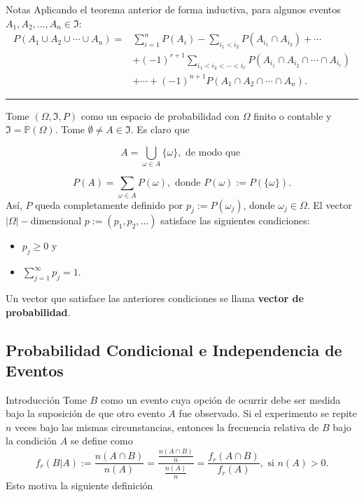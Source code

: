 \documentclass{beamer}
\begin{document}
	\begin{frame}[allowframebreaks]{Notas}
	Aplicando el teorema anterior de forma inductiva, para algunos eventos $A_1,A_2,\dots,A_n\in\Im$:
	\begin{align*}
	P(A_1\cup A_2\cup \cdots\cup A_n)=&\sum_{i=1}^n P(A_i)-\sum_{i_1<i_2}P(A_{i_{1}}\cap A_{i_{2}})+\cdots \\    
			& +(-1)^{r+1}\sum_{i_1<i_2<	\cdots<i_r}P(A_{i_1}\cap A_{i_2}\cap\cdots\cap A_{i_r})\\
			&+\cdots+(-1)^{n+1}P(A_1\cap A_2\cap \cdots\cap A_n).
	\end{align*}
	\noindent\rule{8cm}{0.4pt}
	
	Tome $(\Omega,\Im,P)$ como un espacio de probabilidad con $\Omega$ finito o contable y $\Im =\mathbb{P}(\Omega)$. Tome $\emptyset\neq A \in\Im.$ Es claro que
	
	$$A=\bigcup_{\omega\in A} \{\omega\}, \text{ de modo que }$$
	
	$$P(A)=\sum_{\omega\in A} P(\omega), \text{ donde } P(\omega):=P(\{\omega\}).$$
	Así, $P$ queda completamente definido por $p_j:=P(\omega_j)$, donde $\omega_j\in\Omega.$ El vector $|\Omega|-$dimensional $p:=(p_1,p_2,\dots)$ satisface las siguientes condiciones:
	\begin{itemize}
		\item $p_j\geq0$ y
		\item $\sum_{j=1}^\infty p_j=1.$
	\end{itemize}
	Un vector que satisface las anteriores condiciones se llama \textbf{vector de probabilidad}.	
	
	\end{frame}
	\subsection{Probabilidad Condicional e Independencia de Eventos}
	\begin{frame}{Introducción}
		Tome $B$ como un evento cuya opción de ocurrir debe ser medida bajo la suposición de que otro evento $A$ fue observado. Si el experimento se repite $n$ veces bajo las mismas circunstancias, entonces la frecuencia relativa de $B$ bajo la condición $A$ se define como
		$$f_r(B|A):=\frac{n(A\cap B)}{n(A)}=\frac{\frac{n(A\cap B)}{n}}{\frac{n(A)}{n}}=\frac{f_r(A\cap B)}{f_r(A)}, \text{ si }n(A)>0.$$
		Esto motiva la siguiente definición
	\end{frame}
	
\end{document}
